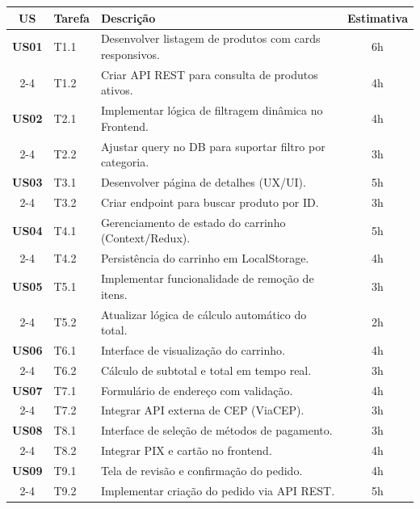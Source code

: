 \documentclass[12pt]{article}
\begin{document}
\begin{table}[H]
\centering
\small
\renewcommand{\arraystretch}{1.3}
\begin{tabular}{|c|l|p{8.5cm}|c|}
\hline
\rowcolor{gray!40} \textbf{US} & \textbf{Tarefa} & \textbf{Descrição} & \textbf{Estimativa} \\ \hline
\textbf{US01} & T1.1 & Desenvolver listagem de produtos com cards responsivos. & 6h \\ \cline{2-4}
              & T1.2 & Criar API REST para consulta de produtos ativos. & 4h \\ \hline
\textbf{US02} & T2.1 & Implementar lógica de filtragem dinâmica no Frontend. & 4h \\ \cline{2-4}
              & T2.2 & Ajustar query no DB para suportar filtro por categoria. & 3h \\ \hline
\textbf{US03} & T3.1 & Desenvolver página de detalhes (UX/UI). & 5h \\ \cline{2-4}
              & T3.2 & Criar endpoint para buscar produto por ID. & 3h \\ \hline
\textbf{US04} & T4.1 & Gerenciamento de estado do carrinho (Context/Redux). & 5h \\ \cline{2-4}
              & T4.2 & Persistência do carrinho em LocalStorage. & 4h \\ \hline
\textbf{US05} & T5.1 & Implementar funcionalidade de remoção de itens. & 3h \\ \cline{2-4}
              & T5.2 & Atualizar lógica de cálculo automático do total. & 2h \\ \hline
\textbf{US06} & T6.1 & Interface de visualização do carrinho. & 4h \\ \cline{2-4}
              & T6.2 & Cálculo de subtotal e total em tempo real. & 3h \\ \hline
\textbf{US07} & T7.1 & Formulário de endereço com validação. & 4h \\ \cline{2-4}
              & T7.2 & Integrar API externa de CEP (ViaCEP). & 3h \\ \hline
\textbf{US08} & T8.1 & Interface de seleção de métodos de pagamento. & 3h \\ \cline{2-4}
              & T8.2 & Integrar PIX e cartão no frontend. & 4h \\ \hline
\textbf{US09} & T9.1 & Tela de revisão e confirmação do pedido. & 4h \\ \cline{2-4}
              & T9.2 & Implementar criação do pedido via API REST. & 5h \\ \hline

\end{tabular}
\end{table}
\end{document}
